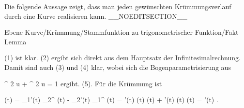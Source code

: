 Die folgende Aussage zeigt, dass man jeden gewünschten Krümmungsverlauf durch eine Kurve realisieren kann.
__NOEDITSECTION__

{Ebene Kurve/Krümmung/Stammfunktion zu trigonometrischer Funktion/Fakt}
{Lemma}
{}
{

\faktzusatz {}
\faktzusatz {}

}
{

(1) ist klar. (2) ergibt sich direkt aus dem Hauptsatz der Infinitesimalrechnung. Damit sind auch (3) und (4) klar, wobei sich die Bogenparametrisierung aus

\mavergleichskette
{\vergleichskette
{ \cos^{ 2  }  u + \sin^{ 2  }  u
}
{ = }{ 1
}
{  }{
}
{    }{
}
{   }{
}
}
{}{}{}
ergibt. (5). Für die Krümmung ist

\mavergleichskettedisp
{\vergleichskette
{ \kappa(t)
}
{ =} { \gamma_1'(t) \gamma_2^{\prime \prime} (t) - \gamma_2'(t) \gamma_1^{\prime \prime} (t)
}
{ =} { \psi'(t) \cos  \psi(t)  \cos  \psi(t) + \psi'(t)  \sin  \psi(t)  \sin  \psi(t)
}
{ =} { \psi'(t)
}
{ } {
}
}
{}{}{.}

}

